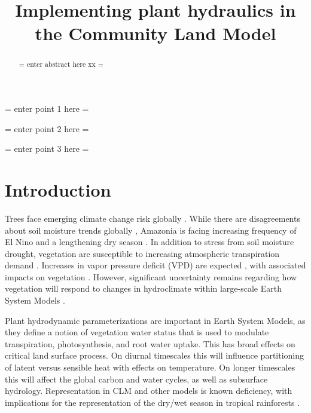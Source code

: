 \documentclass[draft,linenumbers]{agujournal}
\begin{document}
\title{Implementing plant hydraulics in the Community Land Model}



\begin{keypoints}
\item = enter point 1 here = 
\item = enter point 2 here = 
\item = enter point 3 here = 
\end{keypoints}


\begin{abstract}
= enter abstract here xx =
\end{abstract}


\section{Introduction}

Trees face emerging climate change risk globally \citep{allen2010,anderegg2013b}.
While there are disagreements about soil moisture trends globally \citep{dai2013,sheffield2012}, 
Amazonia is facing increasing frequency of El Nino \citep{cai2014} and a lengthening dry season \citep{fu2013}.
In addition to stress from soil moisture drought, vegetation are susceptible to increasing atmospheric transpiration demand \citep{restaino2016,novick2016b}.
Increases in vapor pressure deficit (VPD) are expected \citep{ficklin2017,seager2015}, with associated impacts on vegetation \citep{williams2013,mcdowell2015}.
However, significant uncertainty remains regarding how vegetation will respond to changes in hydroclimate within large-scale Earth System Models \citep{dekauwe2017,friedlingstein2014}.

Plant hydrodynamic parameterizations are important in Earth System Models, as
they define a notion of vegetation water status that is used to modulate transpiration, photosynthesis, and root water uptake. 
This has broad effects on critical land surface process.
On diurnal timescales this will influence partitioning of latent versus sensible heat with effects on temperature.
On longer timescales this will affect the global carbon and water cycles, as well as subsurface hydrology.
Representation in CLM and other models is known deficiency, with implications for the representation of the dry/wet season in tropical rainforests \citep{powell2013,ukkola2016}.
\end{document}
